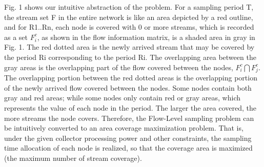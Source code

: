 \documentclass[conference,compsoc]{IEEEtran}
\begin{document}
Fig. 1 shows our intuitive abstraction of the problem. For a sampling period T, the stream set F in the entire network is like an area depicted by a red outline, and for R1..Rn, each node is covered with 0 or more streams, which is recorded as a set $F_i^c$, as shown in the flow information matrix, is a shaded area in gray in Fig. 1. The red dotted area is the newly arrived stream that may be covered by the period Ri corresponding to the period Ri. The overlapping area between the gray areas is the overlapping part of the flow covered between the nodes, $F_i^c \bigcap F_j^c$. The overlapping portion between the red dotted areas is the overlapping portion of the newly arrived flow covered between the nodes. Some nodes contain both gray and red areas; while some nodes only contain red or gray areas, which represents the value of each node in the period. The larger the area covered, the more streams the node covers. Therefore, the Flow-Level sampling problem can be intuitively converted to an area coverage maximization problem. That is, under the given collector processing power and other constraints, the sampling time allocation of each node is realized, so that the coverage area is maximized (the maximum number of stream coverage).
\end{document}
